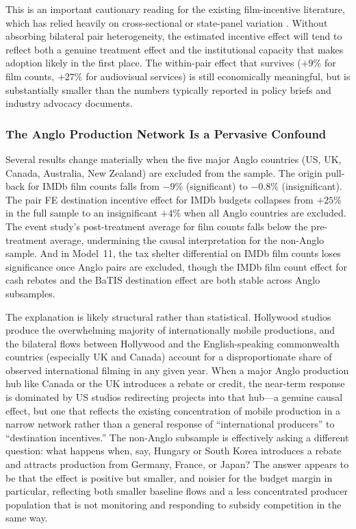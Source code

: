 This is an important cautionary reading for the existing film-incentive literature, which has relied heavily on cross-sectional or state-panel variation \citep{button2019, thom2018}. Without absorbing bilateral pair heterogeneity, the estimated incentive effect will tend to reflect both a genuine treatment effect and the institutional capacity that makes adoption likely in the first place. The within-pair effect that survives ($+9\%$ for film counts, $+27\%$ for audiovisual services) is still economically meaningful, but is substantially smaller than the numbers typically reported in policy briefs and industry advocacy documents.

\subsubsection{The Anglo Production Network Is a Pervasive Confound}

Several results change materially when the five major Anglo countries (US, UK, Canada, Australia, New Zealand) are excluded from the sample. The origin pull-back for IMDb film counts falls from $-9\%$ (significant) to $-0.8\%$ (insignificant). The pair FE destination incentive effect for IMDb budgets collapses from $+25\%$ in the full sample to an insignificant $+4\%$ when all Anglo countries are excluded. The event study's post-treatment average for film counts falls below the pre-treatment average, undermining the causal interpretation for the non-Anglo sample. And in Model~11, the tax shelter differential on IMDb film counts loses significance once Anglo pairs are excluded, though the IMDb film count effect for cash rebates and the BaTIS destination effect are both stable across Anglo subsamples.

The explanation is likely structural rather than statistical. Hollywood studios produce the overwhelming majority of internationally mobile productions, and the bilateral flows between Hollywood and the English-speaking commonwealth countries (especially UK and Canada) account for a disproportionate share of observed international filming in any given year. When a major Anglo production hub like Canada or the UK introduces a rebate or credit, the near-term response is dominated by US studios redirecting projects into that hub---a genuine causal effect, but one that reflects the existing concentration of mobile production in a narrow network rather than a general response of ``international producers'' to ``destination incentives.'' The non-Anglo subsample is effectively asking a different question: what happens when, say, Hungary or South Korea introduces a rebate and attracts production from Germany, France, or Japan? The answer appears to be that the effect is positive but smaller, and noisier for the budget margin in particular, reflecting both smaller baseline flows and a less concentrated producer population that is not monitoring and responding to subsidy competition in the same way.

